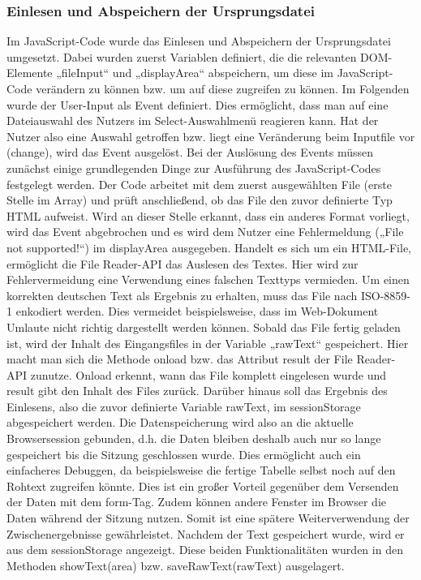 {\subsubsection{Einlesen und Abspeichern der Ursprungsdatei}
Im JavaScript-Code wurde das Einlesen und Abspeichern der Ursprungsdatei umgesetzt. Dabei wurden zuerst Variablen definiert, die die relevanten DOM-Elemente „fileInput“ und „displayArea“ abspeichern, um diese im JavaScript-Code verändern zu können bzw. um auf diese zugreifen zu können. 
Im Folgenden wurde der User-Input als Event definiert. Dies ermöglicht, dass man auf eine Dateiauswahl des Nutzers im Select-Auswahlmenü reagieren kann. Hat der Nutzer also eine Auswahl getroffen bzw. liegt eine Veränderung beim Inputfile vor (change), wird das Event ausgelöst. Bei der Auslösung des Events müssen zunächst einige grundlegenden Dinge zur Ausführung des JavaScript-Codes festgelegt werden. 
Der Code arbeitet mit dem zuerst ausgewählten File (erste Stelle im Array) und prüft anschließend, ob das File den zuvor definierte Typ HTML aufweist. Wird an dieser Stelle erkannt, dass ein anderes Format vorliegt, wird das Event abgebrochen und es wird dem Nutzer eine Fehlermeldung („File not supported!“) im displayArea ausgegeben. 
Handelt es sich um ein HTML-File, ermöglicht die File Reader-\ac{API} das Auslesen des Textes. Hier wird zur Fehlervermeidung eine Verwendung eines falschen Texttyps vermieden. Um einen korrekten deutschen Text als Ergebnis zu erhalten, muss das File nach ISO-8859-1 enkodiert werden. Dies vermeidet beispielsweise, dass im Web-Dokument Umlaute nicht richtig dargestellt werden können. Sobald das File fertig geladen ist, wird der Inhalt des Eingangsfiles in der Variable „rawText“ gespeichert. Hier macht man sich die Methode onload bzw. das Attribut result der File Reader-API zunutze. Onload erkennt, wann das File komplett eingelesen wurde und result gibt den Inhalt des Files zurück. Darüber hinaus soll das Ergebnis des Einlesens, also die zuvor definierte Variable rawText, im sessionStorage abgespeichert werden. Die Datenspeicherung wird also an die aktuelle Browsersession gebunden, d.h. die Daten bleiben deshalb auch nur so lange gespeichert bis die Sitzung geschlossen wurde. Dies ermöglicht auch ein einfacheres Debuggen, da beispielsweise die fertige Tabelle selbst noch auf den Rohtext zugreifen könnte. Dies ist ein großer Vorteil gegenüber dem Versenden der Daten mit dem form-Tag. Zudem können andere Fenster im Browser die Daten während der Sitzung nutzen. Somit ist eine spätere Weiterverwendung der Zwischenergebnisse gewährleistet. Nachdem der Text gespeichert wurde, wird er aus dem sessionStorage angezeigt. Diese beiden Funktionalitäten wurden in den Methoden showText(area) bzw. saveRawText(rawText) ausgelagert. 

}
